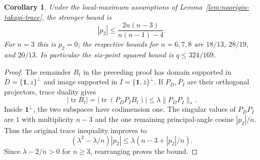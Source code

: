 \documentclass[11pt]{article}
\newtheorem{corollary}[theorem]{Corollary}
\theoremstyle{remark}
\numberwithin{equation}{section}
\begin{document}
\begin{corollary}\label{cor:noorigin-principal-angle-trace}
Under the local-maximum assumptions of
Lemma~\ref{lem:noorigin-takagi-trace}, the stronger bound is
\[
 |p_2|\le\frac{2n(n-3)}{n(n-1)-4}.
\]
For $n=3$ this is $p_2=0$; the respective bounds for $n=6,7,8$
are $18/13$, $28/19$, and $20/13$.
In particular the six-point squared bound is $q\le324/169$.
\end{corollary}
\begin{proof}
The remainder $B_t$ in the preceding proof has domain supported in
$D=\{\mathbf1,z\}^\perp$ and image supported in
$I=\{\mathbf1,\overline z\}^\perp$. If $P_D,P_I$ are their
orthogonal projectors, trace duality gives
\[
 |\operatorname{tr}B_t|
       =|\operatorname{tr}(P_DP_I B_t)|
       \le\lambda\|P_DP_I\|_*.
\]
Inside $\mathbf1^\perp$, the two subspaces have codimension one.
The singular values of $P_DP_I$ are $1$ with multiplicity $n-3$
and the one remaining principal-angle cosine $|p_2|/n$.
Thus the original trace inequality improves to
\[
 (\lambda^2-\lambda/n)|p_2|
       \le\lambda(n-3+|p_2|/n).
\]
Since $\lambda-2/n>0$ for $n\ge3$, rearranging proves the bound.
\end{proof}
\end{document}
